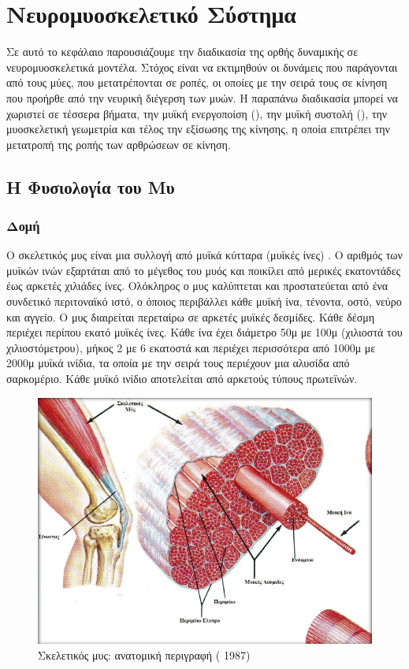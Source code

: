 \chapter{Νευρομυοσκελετικό Σύστημα}

Σε αυτό το κεφάλαιο παρουσιάζουμε την διαδικασία της ορθής δυναμικής σε νευρομυοσκελετικά μοντέλα. Στόχος είναι να εκτιμηθούν οι δυνάμεις που παράγονται από τους μύες, που μετατρέπονται σε  ροπές, οι οποίες με την σειρά τους σε κίνηση που προήρθε από την νευρική διέγερση των μυών. Η παραπάνω διαδικασία μπορεί να χωριστεί σε τέσσερα βήματα, την μυϊκή ενεργοποίση (), την μυϊκή συστολή (), την μυοσκελετική γεωμετρία και τέλος την εξίσωσης της κίνησης, η οποία επιτρέπει την μετατροπή της ροπής των αρθρώσεων σε κίνηση.

\section{H Φυσιολογία του Μυ}

\subsection{Δομή}

Ο σκελετικός μυς είναι μια συλλογή από μυϊκά κύτταρα (μυϊκές ίνες) \cite{zirinoglou}. Ο αριθμός των μυϊκών ινών εξαρτάται από το μέγεθος του μυός και ποικίλει από μερικές εκατοντάδες έως αρκετές χιλιάδες ίνες. Ολόκληρος ο μυς καλύπτεται και προστατεύεται από ένα συνδετικό περιτοναϊκό ιστό, ο όποιος περιβάλλει κάθε μυϊκή ίνα, τένοντα, οστό, νεύρο και αγγείο. Ο μυς διαιρείται περεταίρω σε αρκετές μυϊκές δεσμίδες. Κάθε δέσμη περιέχει περίπου εκατό μυϊκές ίνες. Κάθε ίνα έχει διάμετρο 50μ με 100μ (χιλιοστά του χιλιοστόμετρου), μήκος 2 με 6 εκατοστά και περιέχει περισσότερα από 1000μ με 2000μ μυϊκά ινίδια, τα οποία με την σειρά τους περιέχουν μια αλυσίδα από σαρκομέριο. Κάθε μυϊκό ινίδιο αποτελείται από αρκετούς τύπους πρωτεϊνών.

\begin{figure}[H]
    \centering
    \includegraphics[width=.7\textwidth]{neuromusculoskeletal/fig/muscle-fysiology.png}
    \caption{Σκελετικός μυς: ανατομική περιγραφή ( 1987)}
    \label{fig:muscle-fysiology}
\end{figure}

